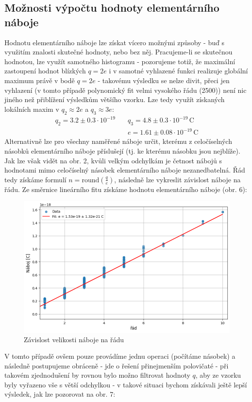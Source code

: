 \documentclass[czech,11pt,a4paper]{article}
\begin{document}
\begin{multicols}{2}
		 \section{Možnosti výpočtu hodnoty elementárního náboje}
		 Hodnotu elementárního náboje lze získat vícero možnými způsoby - buď s využitím znalosti skutečné hodnoty, nebo bez něj. Pracujeme-li se skutečnou hodnotou, lze využít samotného histogramu - pozorujeme totiž, že maximální zastoupení hodnot blízkých $q = 2e$ i v samotné vyhlazené funkci realizuje globální maximum právě v bodě $q = 2e$ - takovému výsledku se nelze divit, přeci jen vyhlazení (v tomto případě polynomický fit velmi vysokého řádu (2500)) není nic jiného než přiblížení výsledkům většího vzorku. Lze tedy využít získaných lokálních maxim v $q_2 \approx 2e $ a $q_3 \approx 3e$:
		 {\small \begin{align*}
		 	q_2 = 3.2\pm 0.3\cdot10^{-19} &\quad q_3 = 4.8\pm 0.3\cdot 10^{-19} \,\mathrm{C} \\
		 	&\quad e = 1.61\pm 0.08 \cdot 10^{-19} \,\mathrm{C}
		 \end{align*}}
	 	Alternativně lze pro všechny naměřené náboje určit, kterému z celočíselných násobků elementárního náboje příslušejí (tj. ke kterému násobku jsou nejblíže). Jak lze však vidět na obr. 2, kvůli velkým odchylkám je četnost nábojů s hodnotami mimo celočíselný násobek elementárního náboje nezanedbatelná. Řád tedy získáme formulí $n = \mathrm{round}(\frac{q}{e})$, následně lze vykreslit závislost náboje na řádu. Ze směrnice lineárního fitu získáme hodnotu elementárního náboje (obr. 6):
		 \begin{figure}[H]
	 	 	\centering
	 	 	\includegraphics[width=0.8\linewidth]{fit1}
	 	 	\caption{Závislost velikosti náboje na řádu}
	 	 	
		 \end{figure}
		 V tomto případě ovšem pouze provádíme jednu operaci (počítáme násobek) a následně postupujeme obráceně - jde o řešení přinejmenším polovičaté - při takovém zjednodušení by rovnou bylo možno filtrovat hodnoty $q$, aby ze vzorku byly vyřazeno vše s větší odchylkou - v takové situaci bychom získávali ještě lepší výsledek, jak lze pozorovat na obr. 7:
		 

\end{multicols}
\end{document}
